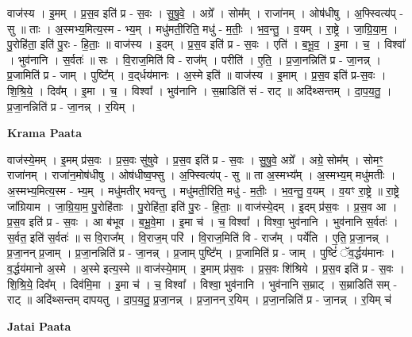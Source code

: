 \documentclass[17pt]{extarticle}
\begin{document}
वाज॑स्य । इ॒मम् । प्र॒स॒व इति॑ प्र - स॒वः । सु॒षु॒वे॒ । अग्रे᳚ । सोम᳚म् । राजा॑नम् । ओष॑धीषु । अ॒फ्स्वित्य॑प् - सु ॥ ताः । अ॒स्मभ्य॒मित्य॒स्म - भ्य॒म् । मधु॑मती॒रिति॒ मधु॑ - म॒तीः॒ । भ॒व॒न्तु॒ । व॒यम् । रा॒ष्ट्रे । जा॒ग्रि॒या॒म॒ । पु॒रोहि॑ता॒ इति॑ पु॒रः - हि॒ताः॒ ॥ वाज॑स्य । इ॒दम् । प्र॒स॒व इति॑ प्र - स॒वः । एति॑ । ब॒भू॒व॒ । इ॒मा । च॒ । विश्वा᳚ । भुव॑नानि । स॒र्वतः॑ ॥ सः । वि॒राज॒मिति॑ वि - राज᳚म् । परीति॑ । ए॒ति॒ । प्र॒जा॒नन्निति॑ प्र - जा॒नन्न् । प्र॒जामिति॑ प्र - जाम् । पुष्टि᳚म् । व॒द्‌र्धय॑मानः । अ॒स्मे इति॑ ॥ वाज॑स्य । इ॒माम् । प्र॒स॒व इति॑ प्र-स॒वः । शि॒श्रि॒ये॒ । दिव᳚म् । इ॒मा । च॒ । विश्वा᳚ । भुव॑नानि । स॒म्राडिति॑ सं - राट् ॥ अदि॑थ्सन्तम् । दा॒प॒य॒तु॒ । प्र॒जा॒नन्निति॑ प्र - जा॒नन्न् । र॒यिम् ।  \newline


\textbf{Krama Paata} \newline

वाज॑स्ये॒मम् । इ॒मम् प्र॑स॒वः । प्र॒स॒वः सु॑षुवे । प्र॒स॒व इति॑ प्र - स॒वः । सु॒षु॒वे॒ अग्रे᳚ । अग्रे॒ सोम᳚म् । सोमꣳ॒॒ राजा॑नम् । राजा॑न॒मोष॑धीषु । ओष॑धीष्व॒फ्सु । अ॒फ्स्वित्य॑प् - सु ॥ ता अ॒स्मभ्य᳚म् । अ॒स्मभ्य॒म् मधु॑मतीः । अ॒स्मभ्य॒मित्य॒स्म - भ्य॒म् । मधु॑मतीर् भवन्तु । मधु॑मती॒रिति॒ मधु॑ - म॒तीः॒ । भ॒व॒न्तु॒ व॒यम् । व॒यꣳ रा॒ष्ट्रे ॥ रा॒ष्ट्रे जा᳚ग्रियाम । जा॒ग्रि॒या॒म॒ पु॒रोहि॑ताः । पु॒रोहि॑ता॒ इति॑ पु॒रः - हि॒ताः॒ ॥ वाज॑स्ये॒दम् । इ॒दम् प्र॑स॒वः । प्र॒स॒व आ । प्र॒स॒व इति॑ प्र - स॒वः । आ ब॑भूव । ब॒भू॒वे॒मा । इ॒मा च॑ । च॒ विश्वा᳚ । विश्वा॒ भुव॑नानि । भुव॑नानि स॒र्वतः॑ । स॒र्वत॒ इति॑ स॒र्वतः॑ ॥ स वि॒राज᳚म् । वि॒राज॒म् परि॑ । वि॒राज॒मिति॑ वि - राज᳚म् । पर्ये॑ति । ए॒ति॒ प्र॒जा॒नन्न् । प्र॒जा॒नन् प्र॒जाम् । प्र॒जा॒नन्निति॑ प्र - जा॒नन्न् । प्र॒जाम् पुष्टि᳚म् । प्र॒जामिति॑ प्र - जाम् । पुष्टिं॑ ॅव॒र्द्धय॑मानः । व॒र्द्धय॑मानो अ॒स्मे । अ॒स्मे इत्य॒स्मे ॥ वाज॑स्ये॒माम् । इ॒माम् प्र॑स॒वः । प्र॒स॒वः शि॑श्रिये । प्र॒स॒व इति॑ प्र - स॒वः । शि॒श्रि॒ये॒ दिव᳚म् । दिव॑मि॒मा । इ॒मा च॑ । च॒ विश्वा᳚ । विश्वा॒ भुव॑नानि । भुव॑नानि स॒म्राट् । स॒म्राडिति॑ सम् - राट् ॥ अदि॑थ्सन्तम् दापयतु । दा॒प॒य॒तु॒ प्र॒जा॒नन्न् । प्र॒जा॒नन् र॒यिम् । प्र॒जा॒नन्निति॑ प्र - जा॒नन्न् । र॒यिम् च॑ \newline

\textbf{Jatai Paata} \newline
\end{document}
